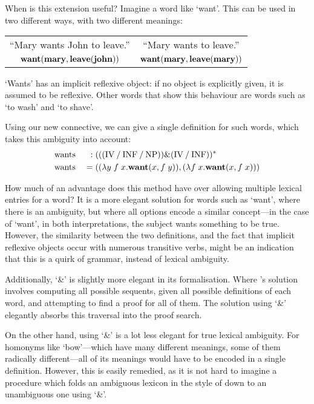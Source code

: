 When is this extension useful? Imagine a word like `want'. This can be
used in two different ways, with two different meanings:\\
\begin{center}
  \vspace{-1\baselineskip}
  \renewcommand{\arraystretch}{1}
  \begin{tabular}{c c}
    ``Mary wants John to leave.'' & ``Mary wants to leave.''\\
    $\WANT(\MARY,\LEAVE(\JOHN))$  & $\WANT(\MARY,\LEAVE(\MARY))$
  \end{tabular}
\end{center}
`Wants' has an implicit reflexive object: if no object is explicitly
given, it is assumed to be reflexive. Other words that show this
behaviour are words such as `to wash' and `to shave'.

Using our new connective, we can give a single definition for such
words, which takes this ambiguity into account:
\begin{alignat*}{3}
  &\text{wants}\;&:\;&\tr[(((\IV\impl\INF\impl\NP))\&(\IV\impl\INF))]\\
  &\text{wants}\;&=\;&((\lambda y\;f\;x.\WANT(x,f\;y)),(\lambda f\;x.\WANT(x,f\;x)))
\end{alignat*}

How much of an advantage does this method have over allowing multiple
lexical entries for a word? It is a more elegant solution for words
such as `want', where there is an ambiguity, but where all options
encode a similar concept---in the case of `want', in both
interpretations, the subject wants something to be true.
However, the similarity between the two definitions, and the
fact that implicit reflexive objects occur with numerous transitive
verbs, might be an indication that this is a quirk of grammar, instead
of lexical ambiguity.

Additionally, `\&' is slightly more elegant in its formalisation.
Where \citeauthor{lambek1958}'s solution involves computing all
possible sequents, given all possible definitions of each word, and
attempting to find a proof for all of them. The solution using `\&'
elegantly absorbs this traversal into the proof search.

On the other hand, using `\&' is a lot less elegant for true lexical
ambiguity. For homonyms like `bow'---which have many different
meanings, some of them radically different---all of its meanings would
have to be encoded in a single definition. However, this is easily
remedied, as it is not hard to imagine a procedure which folds an
ambiguous lexicon in the style of \citeauthor{lambek1958} down to an
unambiguous one using `\&'.
